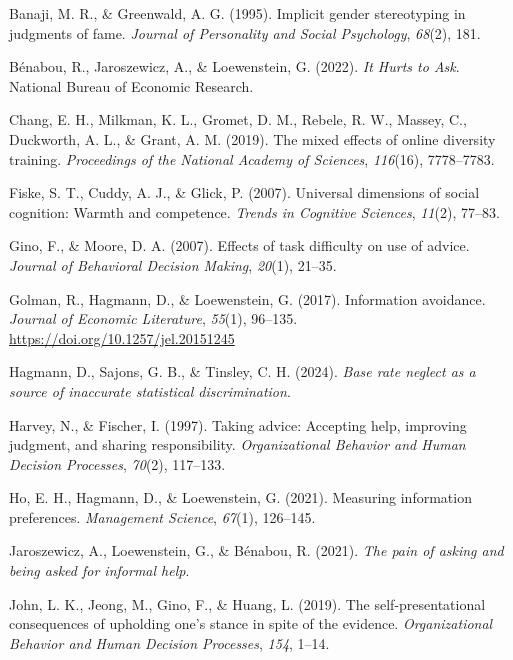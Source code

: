 \documentclass[
  man,
  floatsintext,
  longtable,
  nolmodern,
  notxfonts,
  notimes,
  colorlinks=true,linkcolor=blue,citecolor=blue,urlcolor=blue]{apa7}
\newlength{\cslhangindent}
\newenvironment{CSLReferences}[2] %
 {\begin{list}{}{%
  \setlength{\itemindent}{0pt}
  \setlength{\leftmargin}{0pt}
  \setlength{\parsep}{0pt}
  \ifodd #1
   \setlength{\leftmargin}{\cslhangindent}
   \setlength{\itemindent}{-1\cslhangindent}
  \fi
  \setlength{\itemsep}{#2\baselineskip}}}
 {\end{list}}
\begin{document}
\label{refs}
\begin{CSLReferences}{1}{0}
Banaji, M. R., \& Greenwald, A. G. (1995). Implicit gender stereotyping
in judgments of fame. \emph{Journal of Personality and Social
Psychology}, \emph{68}(2), 181.

Bénabou, R., Jaroszewicz, A., \& Loewenstein, G. (2022). \emph{It
{Hurts} to {Ask}}. National Bureau of Economic Research.

Chang, E. H., Milkman, K. L., Gromet, D. M., Rebele, R. W., Massey, C.,
Duckworth, A. L., \& Grant, A. M. (2019). The mixed effects of online
diversity training. \emph{Proceedings of the National Academy of
Sciences}, \emph{116}(16), 7778--7783.

Fiske, S. T., Cuddy, A. J., \& Glick, P. (2007). Universal dimensions of
social cognition: Warmth and competence. \emph{Trends in Cognitive
Sciences}, \emph{11}(2), 77--83.

Gino, F., \& Moore, D. A. (2007). Effects of task difficulty on use of
advice. \emph{Journal of Behavioral Decision Making}, \emph{20}(1),
21--35.

Golman, R., Hagmann, D., \& Loewenstein, G. (2017). Information
avoidance. \emph{Journal of Economic Literature}, \emph{55}(1), 96--135.
\url{https://doi.org/10.1257/jel.20151245}

Hagmann, D., Sajons, G. B., \& Tinsley, C. H. (2024). \emph{Base rate
neglect as a source of inaccurate statistical discrimination}.

Harvey, N., \& Fischer, I. (1997). Taking advice: {Accepting} help,
improving judgment, and sharing responsibility. \emph{Organizational
Behavior and Human Decision Processes}, \emph{70}(2), 117--133.

Ho, E. H., Hagmann, D., \& Loewenstein, G. (2021). Measuring information
preferences. \emph{Management Science}, \emph{67}(1), 126--145.

Jaroszewicz, A., Loewenstein, G., \& Bénabou, R. (2021). \emph{The pain
of asking and being asked for informal help}.

John, L. K., Jeong, M., Gino, F., \& Huang, L. (2019). The
self-presentational consequences of upholding one's stance in spite of
the evidence. \emph{Organizational Behavior and Human Decision
Processes}, \emph{154}, 1--14.


\end{CSLReferences}
\end{document}
